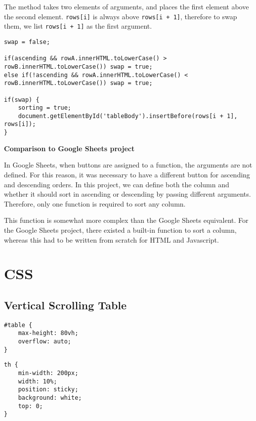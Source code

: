 \documentclass[letterpaper]{article}
\begin{document}
The method takes two elements of arguments, and places the first element above the second element.
\lstinline{rows[i]} is always above \lstinline{rows[i + 1]}, therefore to swap them, we list \lstinline{rows[i + 1]} as the first argument.

\begin{lstlisting}[firstnumber=232]
swap = false;

if(ascending && rowA.innerHTML.toLowerCase() > rowB.innerHTML.toLowerCase()) swap = true;
else if(!ascending && rowA.innerHTML.toLowerCase() < rowB.innerHTML.toLowerCase()) swap = true;

if(swap) {
    sorting = true;
    document.getElementById('tableBody').insertBefore(rows[i + 1], rows[i]);
}
\end{lstlisting}

\textbf{Comparison to Google Sheets project}

In Google Sheets, when buttons are assigned to a function, the arguments are not defined.
For this reason, it was necessary to have a different button for ascending and descending orders.
In this project, we can define both the column and whether it should sort in ascending or descending by passing different arguments.
Therefore, only one function is required to sort any column.

This function is somewhat more complex than the Google Sheets equivalent.
For the Google Sheets project, there existed a built-in function to sort a column, whereas this had to be written from scratch for HTML and Javascript.

\newpage

\section{CSS}\label{CSS}

\subsection{Vertical Scrolling Table}

\begin{lstlisting}[firstnumber=29]
#table {
    max-height: 80vh;
    overflow: auto;
}
\end{lstlisting}

\begin{lstlisting}[firstnumber=39]
th {
    min-width: 200px;
    width: 10%;
    position: sticky;
    background: white;
    top: 0;
}
\end{lstlisting}
\end{document}
